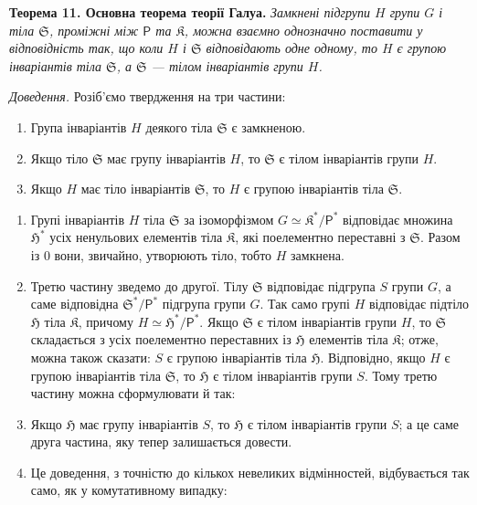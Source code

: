 \documentclass[11pt]{article}
\begin{document}
\textbf{Теорема 11. Основна теорема теорії Галуа.} \emph{Замкнені підгрупи \(H\) групи \(G\) і тіла \(\mathfrak S\), проміжні між \(\mathsf P\) та \(\mathfrak K\), можна взаємно однозначно поставити у відповідність так, що коли \(H\) і \(\mathfrak S\) відповідають одне одному, то \(H\) є групою інваріантів тіла \(\mathfrak S\), а \(\mathfrak S\) --- тілом інваріантів групи \(H\).}

\emph{Доведення.} Розіб'ємо твердження на три частини:
\begin{enumerate}
\item Група інваріантів \(H\) деякого тіла \(\mathfrak S\) є замкненою.
\item Якщо тіло \(\mathfrak S\) має групу інваріантів \(H\), то \(\mathfrak S\) є тілом інваріантів групи \(H\).
\item Якщо \(H\) має тіло інваріантів \(\mathfrak S\), то \(H\) є групою інваріантів тіла \(\mathfrak S\).
\end{enumerate}

\begin{enumerate}
\item Групі інваріантів \(H\) тіла \(\mathfrak S\) за ізоморфізмом \(G\simeq \mathfrak K^*/\mathsf P^*\) відповідає множина \(\mathfrak H^*\) усіх ненульових елементів тіла \(\mathfrak K\), які поелементно переставні з \(\mathfrak S\). Разом із 0 вони, звичайно, утворюють тіло, тобто \(H\) замкнена.

\item Третю частину зведемо до другої. Тілу \(\mathfrak S\) відповідає підгрупа \(S\) групи \(G\), а саме відповідна \(\mathfrak S^*/\mathsf P^*\) підгрупа групи \(G\). Так само групі \(H\) відповідає підтіло \(\mathfrak H\) тіла \(\mathfrak K\), причому \(H\simeq \mathfrak H^*/\mathsf P^*\). Якщо \(\mathfrak S\) є тілом інваріантів групи \(H\), то \(\mathfrak S\) складається з усіх поелементно переставних із \(\mathfrak H\) елементів тіла \(\mathfrak K\); отже, можна також сказати: \(S\) є групою інваріантів тіла \(\mathfrak H\). Відповідно, якщо \(H\) є групою інваріантів тіла \(\mathfrak S\), то \(\mathfrak H\) є тілом інваріантів групи \(S\). Тому третю частину можна сформулювати й так:

\item[\(3'\).] Якщо \(\mathfrak H\) має групу інваріантів \(S\), то \(\mathfrak H\) є тілом інваріантів групи \(S\); а це саме друга частина, яку тепер залишається довести.

\item[3.] Це доведення, з точністю до кількох невеликих відмінностей, відбувається так само, як у комутативному випадку:
\end{enumerate}
\end{document}
